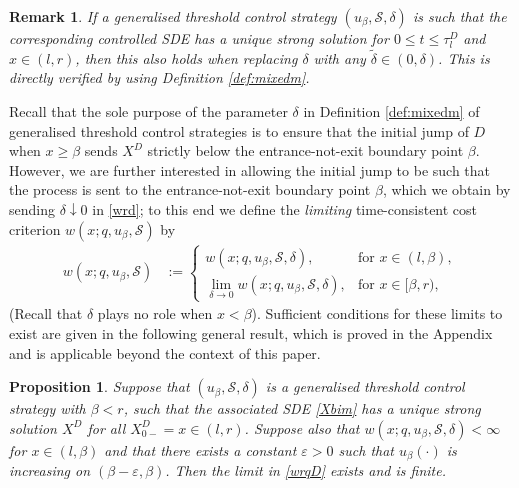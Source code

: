 \documentclass[11pt]{article} %
\newtheorem{proposition}[theorem]{Proposition}
\newtheorem{remark}[theorem]{Remark}
\newcommand{\tild}{\widetilde}
\numberwithin{komcounter}{section}
\renewcommand{\epsilon}{\varepsilon}
\begin{document}
\begin{remark}
\label{rem:on-admiss}
If a generalised threshold control strategy $(u_\beta,\mathcal{S},\delta)$ is such that the corresponding controlled SDE has a unique strong  solution for $0 \leq t \leq \tau^D_l$ and $x \in (l,r)$, then this also holds when replacing $\delta$ with any $\tild \delta \in (0,\delta)$. 
This is directly verified by using Definition \ref{def:mixedm}.  
\end{remark}

Recall that the sole purpose of the parameter $\delta$ in Definition \ref{def:mixedm} of generalised threshold control strategies is to ensure that the initial jump of $D$ when $x\geq \beta$ sends $X^{D}$ strictly below the entrance-not-exit boundary point $\beta$. However, we are further interested in allowing the initial jump to be such that the process is sent to the entrance-not-exit boundary point $\beta$, which we obtain by sending $\delta \downarrow 0$ in \eqref{wrd}; to this end we define the {\it limiting} time-consistent cost criterion $w(x;q, u_\beta, \mathcal{S})$ by 
\begin{align} \label{wrqD}
w(x;q, u_\beta, \mathcal{S}) 
&:= \begin{cases} 
w(x;q, u_\beta, \mathcal{S},\delta), & \text{for } x\in(l,\beta), \\
\lim_{\delta\to 0} w(x;q,u_\beta,\mathcal{S},\delta), & \text{for } x \in [\beta,r),
\end{cases} 
\end{align}
(Recall that $\delta$ plays no role when $x<\beta$).
Sufficient conditions for these limits to exist are given in the following general result, which is proved in the Appendix and is applicable beyond the context of this paper. 

\begin{proposition} \label{prop_limit_ex} 
Suppose that $(u_{\beta},\mathcal{S},\delta)$ is a generalised threshold control strategy with $\beta<r$, 
such that the associated SDE \eqref{Xbim} has a unique strong solution $X^D$ for all $X_{0-}^D= x \in (l,r)$.
Suppose also that $w(x;q,u_\beta,\mathcal{S},\delta)<\infty$ for $x\in (l,\beta)$ and that there exists a constant $\epsilon>0$ such that $u_\beta(\cdot)$ is increasing on $(\beta-\epsilon,\beta)$. 
Then the limit in \eqref{wrqD} exists and is finite.
\end{proposition}
\end{document}
